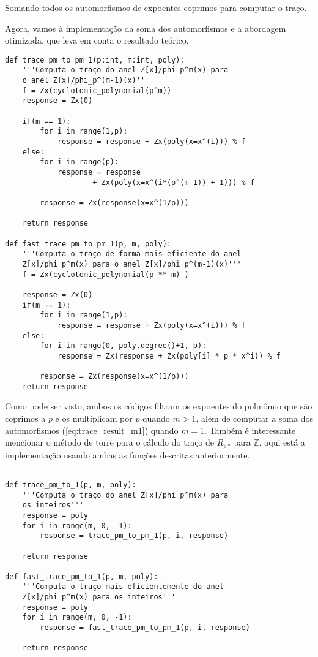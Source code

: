 Somando todos os automorfismos de expoentes coprimos para computar o traço.

Agora, vamos à implementação da soma dos automorfismos e a abordagem otimizada, que leva em conta o resultado teórico.

\newpage 

\begin{verbatim}
def trace_pm_to_pm_1(p:int, m:int, poly):
    '''Computa o traço do anel Z[x]/phi_p^m(x) para
    o anel Z[x]/phi_p^(m-1)(x)'''    
    f = Zx(cyclotomic_polynomial(p^m))
    response = Zx(0)
    
    if(m == 1):
        for i in range(1,p):
            response = response + Zx(poly(x=x^(i))) % f 
    else:    
        for i in range(p):
            response = response 
                    + Zx(poly(x=x^(i*(p^(m-1)) + 1))) % f 

        response = Zx(response(x=x^(1/p)))

    return response

def fast_trace_pm_to_pm_1(p, m, poly):
    '''Computa o traço de forma mais eficiente do anel 
    Z[x]/phi_p^m(x) para o anel Z[x]/phi_p^(m-1)(x)''' 
    f = Zx(cyclotomic_polynomial(p ** m) )

    response = Zx(0)
    if(m == 1):
        for i in range(1,p):
            response = response + Zx(poly(x=x^(i))) % f 
    else:
        for i in range(0, poly.degree()+1, p):
            response = Zx(response + Zx(poly[i] * p * x^i)) % f

        response = Zx(response(x=x^(1/p)))
    return response
\end{verbatim}

Como pode ser visto, ambos os códigos filtram os expoentes do polinômio que são coprimos a $p$ e os multiplicam por $p$ quando
$m>1$, além de computar a soma dos automorfismos (\ref{eq:trace_result_m1}) quando $m=1$. Também é interessante mencionar o método de torre para o cálculo do traço de $R_{p^m}$ para $\mathbb{Z}$, 
aqui está a implementação usando ambas as funções descritas anteriormente.

\newpage

\begin{verbatim}

def trace_pm_to_1(p, m, poly):
    '''Computa o traço do anel Z[x]/phi_p^m(x) para
    os inteiros'''   
    response = poly
    for i in range(m, 0, -1):
        response = trace_pm_to_pm_1(p, i, response)
    
    return response

def fast_trace_pm_to_1(p, m, poly):
    '''Computa o traço mais eficientemente do anel 
    Z[x]/phi_p^m(x) para os inteiros'''   
    response = poly
    for i in range(m, 0, -1):
        response = fast_trace_pm_to_pm_1(p, i, response)

    return response

\end{verbatim}

